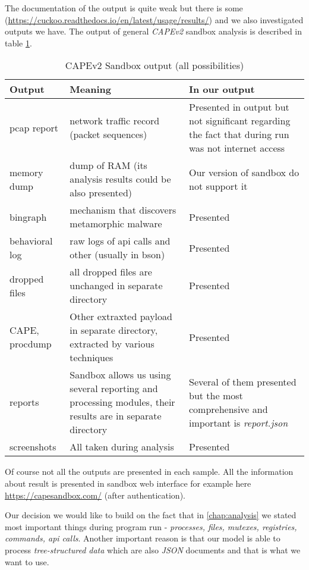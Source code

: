 The documentation of the output is quite weak but there is some (\url{https://cuckoo.readthedocs.io/en/latest/usage/results/}) and we also investigated outputs we have. The output of general \emph{CAPEv2} sandbox analysis is described in table \ref{tab:sandbox-out}.

\begin{table}[h]
    \centering
    \caption{CAPEv2 Sandbox output (all possibilities)}
    \begin{tabular}{p{2cm}p{6cm}p{6cm}} 
        \toprule
        \textbf{Output} &
        \textbf{Meaning} &
        \textbf{In our output} \\
        \midrule
        pcap report & network traffic record (packet sequences) & Presented in output but not significant regarding the fact that during run was not internet access \\
        \midrule
        memory dump & dump of RAM (its analysis results could be also presented)& Our version of sandbox do not support it \\
        \midrule
        bingraph & mechanism that discovers metamorphic malware \cite{Kwon2012}& Presented\\
        \midrule
        behavioral log & raw logs of api calls and other (usually in bson) & Presented \\
        \midrule
        dropped files & all dropped files are unchanged in separate directory & Presented \\
        \midrule
        CAPE, procdump & Other extraxted payload in separate directory, extracted by various techniques \cite{Cape} & Presented \\
        \midrule
        reports & Sandbox allows us using several reporting and processing modules, their results are in separate directory  & Several of them presented but the most comprehensive and important is \emph{report.json} \\
        \midrule
        screenshots & All taken during analysis  & Presented \\
        \bottomrule
    \end{tabular}
    \label{tab:sandbox-out}
\end{table}

Of course not all the outputs are presented in each sample. All the information about result is presented in sandbox web interface for example here \url{https://capesandbox.com/} (after authentication).

Our decision we would like to build on the fact that in \ref{chap:analysis} we stated most important things during program run - \emph{processes, files, mutexes, registries, commands, api calls}. Another important reason is that our model is able to process \emph{tree-structured data} which are also \emph{JSON} documents and that is what we want to use.


